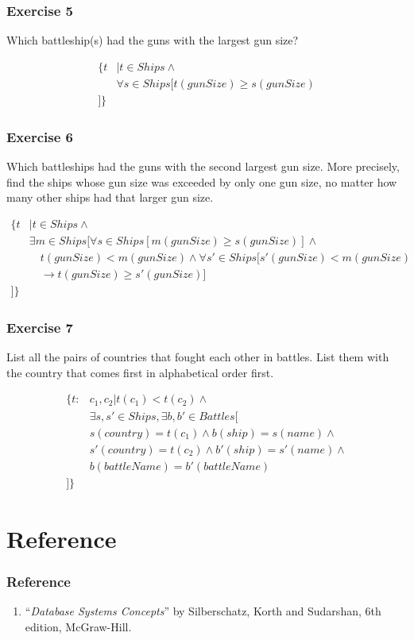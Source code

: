 \documentclass{beamer}
\begin{document}
\begin{frame}[fragile]
\frametitle{Exercise 5}
Which battleship(s) had the guns with the largest gun size?

\begin{align*}
\{t&| t\in Ships \wedge \\ 
&\forall s\in Ships [t(gunSize)\geq s(gunSize)\\
]\}
\end{align*}
\end{frame}

\begin{frame}[fragile]
\frametitle{Exercise 6}
Which battleships had the guns with the second largest gun size. More precisely, find the ships whose gun size was exceeded by only one gun size, no matter how many other ships had that larger gun size. 

\begin{align*}
\{t&| t\in Ships \wedge \\ 
&\exists m \in Ships \Big[\forall s\in Ships [m(gunSize)\geq s(gunSize)] \wedge  \\
& \quad t(gunSize) < m(gunSize) \wedge \forall s' \in Ships [s'(gunSize)< m(gunSize)  \\
& \quad \rightarrow t(gunSize)\geq s'(gunSize)]\\
\Big]\}
\end{align*}
\end{frame}

\begin{frame}[fragile]
\frametitle{Exercise 7}
List all the pairs of countries that fought each other in battles. List them with the country that comes first in alphabetical order first\footnotemark {}.

\begin{align*}
\{t:&c_1, c_2| t(c_1)<t(c_2) \wedge \\ 
&\exists s, s'\in Ships, \exists b, b' \in Battles \Big[\\
& s(country)=t(c_1) \wedge b(ship) =s(name) \wedge \\
& s'(country)=t(c_2) \wedge b'(ship) =s'(name) \wedge \\
& b(battleName) = b'(battleName) \\
\Big]\}
\end{align*}
\end{frame}

\section{Reference}
\begin{frame}[fragile]
\frametitle{Reference}
\begin{enumerate}
\item ``\textit{Database Systems Concepts}'' by Silberschatz, Korth and Sudarshan, 6th edition, McGraw-Hill.
\end{enumerate}
\end{frame}
\end{document}
